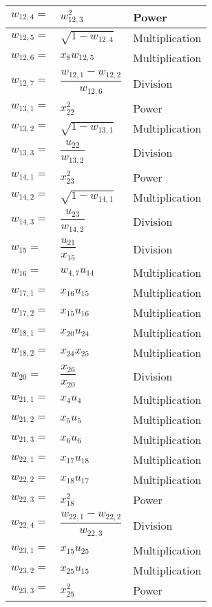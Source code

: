 \begin{longtable}{|p{1.5cm}|l|p{2cm}|}
$w_{12,4}=$ & $ w_{12,3}^{2} $ & Power \\ \hline
$w_{12,5}=$ & $ \sqrt{1-w_{12,4}} $ & Multiplication \\ \hline
$w_{12,6}=$ & $ x_{8}w_{12,5} $ & Multiplication \\ \hline
$w_{12,7}=$ & $ \dfrac{w_{12,1}-w_{12,2}}{w_{12,6}} $ & Division \\ \hline
$w_{13,1}=$ & $ x_{22}^{2} $ & Power \\ \hline
$w_{13,2}=$ & $ \sqrt{1-w_{13,1}} $ & Multiplication \\ \hline
$w_{13,3}=$ & $ \dfrac{u_{22}}{w_{13,2}} $ & Division \\ \hline
$w_{14,1}=$ & $ x_{23}^{2} $ & Power \\ \hline
$w_{14,2}=$ & $ \sqrt{1-w_{14,1}} $ & Multiplication \\ \hline
$w_{14,3}=$ & $ \dfrac{u_{23}}{w_{14,2}} $ & Division \\ \hline
$w_{15}=$ & $ \dfrac{u_{21}}{x_{15}} $ & Division \\ \hline
$w_{16}=$ & $ w_{4,7}u_{14} $ & Multiplication \\ \hline
$w_{17,1}=$ & $ x_{16}u_{15} $ & Multiplication \\ \hline
$w_{17,2}=$ & $ x_{15}u_{16} $ & Multiplication \\ \hline
$w_{18,1}=$ & $ x_{20}u_{24} $ & Multiplication \\ \hline
$w_{18,2}=$ & $ x_{24}x_{25} $ & Multiplication \\ \hline
$w_{20}=$ & $ \dfrac{x_{26}}{x_{20}} $ & Division \\ \hline
$w_{21,1}=$ & $ x_{4}u_{4} $ & Multiplication \\ \hline
$w_{21,2}=$ & $ x_{5}u_{5} $ & Multiplication \\ \hline
$w_{21,3}=$ & $ x_{6}u_{6} $ & Multiplication \\ \hline
$w_{22,1}=$ & $ x_{17}u_{18} $ & Multiplication \\ \hline
$w_{22,2}=$ & $ x_{18}u_{17} $ & Multiplication \\ \hline
$w_{22,3}=$ & $ x_{18}^{2} $ & Power \\ \hline
$w_{22,4}=$ & $ \dfrac{w_{22,1}-w_{22,2}}{w_{22,3}} $ & Division \\ \hline
$w_{23,1}=$ & $ x_{15}u_{25} $ & Multiplication \\ \hline
$w_{23,2}=$ & $ x_{25}u_{15} $ & Multiplication \\ \hline
$w_{23,3}=$ & $ x_{25}^{2} $ & Power  \\ \hline

\end{longtable}
